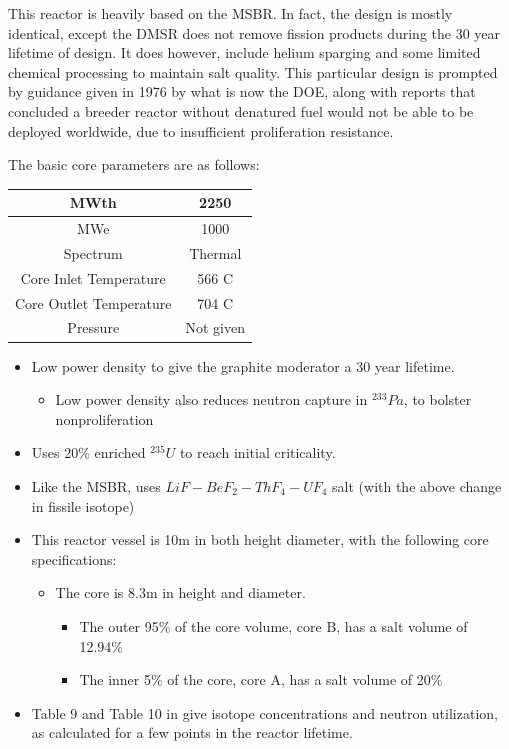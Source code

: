 \documentclass[letterpaper]{article}
\begin{document}
This reactor is heavily based on the MSBR.  In fact, the design is mostly identical, except the DMSR does not remove fission products during the 30 year lifetime of design.  It does however, include helium sparging and some limited chemical processing to maintain salt quality.  This particular design is prompted by guidance given in 1976 by what is now the DOE, along with reports that concluded a breeder reactor without denatured fuel would not be able to be deployed worldwide, due to insufficient proliferation resistance. \cite{engel_conceptual_1980}

The basic core parameters are as follows:

\begin{center}
\begin{tabular}{|c|c|}
\hline
MWth & 2250 \\
\hline
MWe & 1000 \\
\hline
Spectrum & Thermal \\
\hline
Core Inlet Temperature & 566 C \\
\hline
Core Outlet Temperature & 704 C\\
\hline
Pressure & Not given \\
\hline
\end{tabular}
\end{center}

\begin{itemize}
\item Low power density to give the graphite moderator a 30 year lifetime.
	\begin{itemize}
	\item Low power density also reduces neutron capture in ${}^{233}Pa$, to bolster nonproliferation
	\end{itemize}
\item Uses 20\% enriched ${}^{235}U$ to reach initial criticality.
\item Like the MSBR, uses $LiF - BeF_2 - ThF_4 - UF_4$ salt (with the above change in fissile isotope)
\item This reactor vessel is 10m in both height diameter, with the following core specifications:
	\begin{itemize}
	\item The core is 8.3m in height and diameter.
		\begin{itemize}
		\item The outer 95\% of the core volume, core B, has a salt volume of 12.94\%
		\item The inner 5\% of the core, core A, has a salt volume of 20\%
		\end{itemize}
	\end{itemize}
\item Table 9 and Table 10 in \cite{engel_conceptual_1980} give isotope concentrations and neutron utilization, as calculated for a few points in the reactor lifetime.
\end{itemize}
\end{document}
